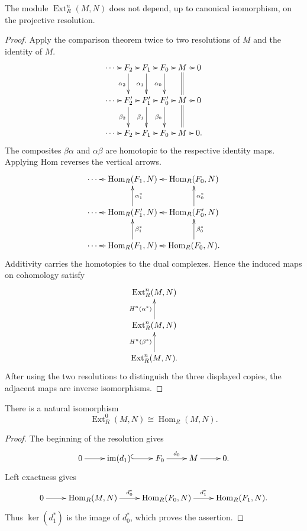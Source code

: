\begin{theorem}
\label{at-theorem-ext-independent}
The module $\operatorname{Ext}^n_R(M,N)$
does not depend, up to canonical
isomorphism, on the projective resolution.
\end{theorem}

\begin{proof}
Apply the comparison theorem twice to two
resolutions of $M$ and the identity of $M$.
$$
\xymatrix@C=.5em{
\cdots \ar[r]
  & F_2 \ar[r] \ar[d]_{\alpha_2}
  & F_1 \ar[r] \ar[d]_{\alpha_1}
  & F_0 \ar[r] \ar[d]_{\alpha_0}
  & M \ar[r] \ar@{=}[d]
  & 0 \\
\cdots \ar[r]
  & F'_2 \ar[r] \ar[d]_{\beta_2}
  & F'_1 \ar[r] \ar[d]_{\beta_1}
  & F'_0 \ar[r] \ar[d]_{\beta_0}
  & M \ar[r] \ar@{=}[d]
  & 0 \\
\cdots \ar[r]
  & F_2 \ar[r]
  & F_1 \ar[r]
  & F_0 \ar[r]
  & M \ar[r]
  & 0.
}
$$
The composites $\beta\alpha$ and
$\alpha\beta$ are homotopic to the
respective identity maps.  Applying Hom
reverses the vertical arrows.
$$
\xymatrix@C=.7em{
\cdots
  & \operatorname{Hom}_R(F_1,N)
    \ar[l]
  & \operatorname{Hom}_R(F_0,N)
    \ar[l] \\
\cdots
  & \operatorname{Hom}_R(F'_1,N)
    \ar[l]
    \ar[u]_{\alpha_1^*}
  & \operatorname{Hom}_R(F'_0,N)
    \ar[l]
    \ar[u]_{\alpha_0^*} \\
\cdots
  & \operatorname{Hom}_R(F_1,N)
    \ar[l]
    \ar[u]_{\beta_1^*}
  & \operatorname{Hom}_R(F_0,N)
    \ar[l]
    \ar[u]_{\beta_0^*}.
}
$$
Additivity carries the homotopies to the
dual complexes.  Hence the induced maps
on cohomology satisfy
$$
\xymatrix{
\operatorname{Ext}^n_R(M,N) \\
\operatorname{Ext}^n_R(M,N)
  \ar[u]^{H^n(\alpha^*)} \\
\operatorname{Ext}^n_R(M,N)
  \ar[u]^{H^n(\beta^*)}.
}
$$
After using the two resolutions to
distinguish the three displayed copies,
the adjacent maps are inverse
isomorphisms.
\end{proof}

\begin{proposition}
\label{at-proposition-ext-zero}
There is a natural isomorphism
$$
\operatorname{Ext}^0_R(M,N)
\cong\operatorname{Hom}_R(M,N).
$$
\end{proposition}

\begin{proof}
The beginning of the resolution gives
$$
\xymatrix{
0 \ar[r]
  & \operatorname{im}(d_1)
    \ar@{^{(}->}[r]
  & F_0 \ar[r]^-{d_0}
  & M \ar[r]
  & 0.
}
$$
Left exactness gives
$$
\xymatrix{
0 \ar[r]
  & \operatorname{Hom}_R(M,N)
    \ar[r]^-{d_0^*}
  & \operatorname{Hom}_R(F_0,N)
    \ar[r]^-{d_1^*}
  & \operatorname{Hom}_R(F_1,N).
}
$$
Thus $\ker(d_1^*)$ is the image of
$d_0^*$, which proves the assertion.
\end{proof}

